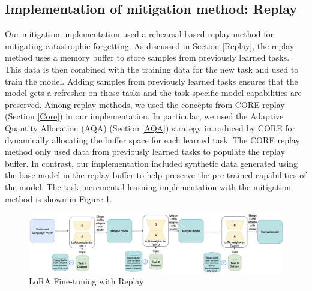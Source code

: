 \subsection{Implementation of mitigation method: Replay} \label{mitigation_setup}
Our mitigation implementation used a rehearsal-based replay method for mitigating catastrophic forgetting. As discussed in Section \ref{Replay}, the replay method uses a memory buffer to store samples from previously learned tasks. This data is then combined with the training data for the new task and used to train the model. Adding samples from previously learned tasks ensures that the model gets a refresher on those tasks and the task-specific model capabilities are preserved. Among replay methods, we used the concepts from CORE replay (Section \ref{Core}) in our implementation. In particular, we used the Adaptive Quantity Allocation (AQA) (Section \ref{AQA}) strategy introduced by CORE for dynamically allocating the buffer space for each learned task. The CORE replay method only used data from previously learned tasks to populate the replay buffer. In contrast, our implementation included synthetic data generated using the base model in the replay buffer to help preserve the pre-trained capabilities of the model. The task-incremental learning implementation with the mitigation method is shown in Figure \ref{fig:ReplayFinetuning}.

\begin{figure}[h]
    \centering
    \includegraphics[width=1\textwidth]{Figures/methodology/lora_finetuning_with_replay.jpeg} 
    \caption{LoRA Fine-tuning with Replay}
    \label{fig:ReplayFinetuning}
\end{figure}

